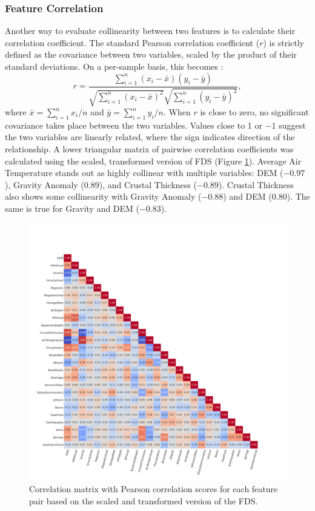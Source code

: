 \subsubsection{Feature Correlation}\label{ch3:feat_corr}
Another way to evaluate collinearity between two features is to calculate their correlation coefficient. The standard Pearson correlation coefficient ($r$) is strictly defined as the covariance between two variables, scaled by the product of their standard deviations. On a per-sample basis, this becomes \citep[p.\ 70]{james_introduction_2013}:
\begin{equation}
    r = \frac{\sum_{i=1}^n(x_i-\bar{x})(y_i-\bar{y})}{\sqrt{\sum_{i=1}^n(x_i-\bar{x})^2} \sqrt{\sum_{i=1}^n(y_i-\bar{y})^2}},
\end{equation}
where $\bar x=\sum_{i=1}^nx_i/n$ and $\bar y=\sum_{i=1}^ny_i/n$.
When $r$ is close to zero, no significant covariance takes place between the two variables. Values close to 1 or $-1$ suggest the two variables are linearly related, where the sign indicates direction of the relationship. A lower triangular matrix of pairwise correlation coefficients was calculated using the scaled, transformed version of FDS (Figure \ref{fig:corr_matrix}). Average Air Temperature stands out as highly collinear with multiple variables: DEM ($-0.97$), Gravity Anomaly (0.89), and Crustal Thickness ($-0.89$). Crustal Thickness also shows some collinearity with Gravity Anomaly ($-0.88$) and DEM (0.80). The same is true for Gravity and DEM ($-0.83$).

\begin{figure}[!htp]
\centering
\includegraphics[width=\textwidth]{templates/images/Figure-Scaled_Correlation_Matrix.png}
\caption[Feature correlation matrix]{Correlation matrix with Pearson correlation scores for each feature pair based on the scaled and transformed version of the FDS.}
\label{fig:corr_matrix}
\end{figure}

